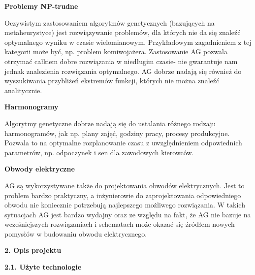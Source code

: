 \documentclass[a4paper, twoside, 12pt, justified]{article}
\begin{document}
	\begin{center}
		\textbf{Problemy NP-trudne}
	\end{center}	
	Oczywistym zastosowaniem algorytmów genetycznych (bazujących na metaheurystyce) jest rozwiązywanie problemów, dla których nie da się znaleźć optymalnego wyniku w czasie wielomianowym. Przykładowym zagadnieniem z tej kategorii może być, np. problem komiwojażera. Zastosowanie AG pozwala otrzymać całkiem dobre rozwiązania w niedługim czasie- nie gwarantuje nam jednak znalezienia rozwiązania optymalnego. AG dobrze nadają się również do wyszukiwania przybliżeń ekstremów funkcji, których nie można znaleźć analitycznie.\\

	
	\begin{center}
		\textbf{Harmonogramy}
	\end{center}
	
	Algorytmy genetyczne dobrze nadają się do ustalania różnego rodzaju harmonogramów, jak np. plany zajęć, godziny pracy, procesy produkcyjne. Pozwala to na optymalne rozplanowanie czasu z uwzględnieniem odpowiednich parametrów, np. odpoczynek i sen dla zawodowych kierowców.  
	
	
	\begin{center}
		\textbf{Obwody elektryczne}
	\end{center}

	AG są wykorzystywane także do projektowania obwodów elektrycznych. Jest to problem bardzo praktyczny, a inżynierowie do zaprojektowania odpowiedniego obwodu nie koniecznie potrzebują najlepszego możliwego rozwiązania. W takich sytuacjach AG jest bardzo wydajny oraz ze względu na fakt, że AG nie bazuje na wcześniejszych rozwiązaniach i schematach może okazać się źródłem nowych pomysłów w budowaniu obwodu elektrycznego. 
	
	\newpage
	\begin{flushleft}
		\begin{large}
			\textbf{2. Opis projektu}
		\end{large}
	\end{flushleft}
	
	\vspace{5mm} %
	
	\begin{flushleft}
		\begin{large}
			\textbf{2.1. Użyte technologie}
		\end{large}
	\end{flushleft}
	\vspace{10mm} %
	
\end{document}
